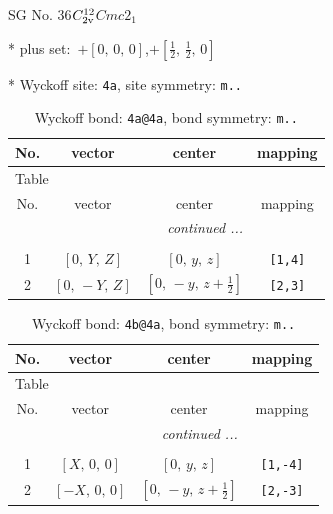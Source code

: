 \documentclass[fleqn,8pt]{jsarticle}
\begin{document}
\setcounter{MaxMatrixCols}{32}

\renewcommand{\tablename}{Table~}
\renewcommand{\figurename}{Figure~}
\begin{center}
\LARGE
SG No. 36\quad$C_{\rm 2v}^{12}$\quad$Cmc2_1$\quad[ orthorhombic ]
\end{center}

* plus set:\,\,\,$+\left[ 0,\, 0,\, 0 \right]$,\quad $+\left[ \frac{1}{2},\, \frac{1}{2},\, 0 \right]$


* Wyckoff site: {\tt 4a}, site symmetry: {\tt m..}
\renewcommand{\arraystretch}{1.2}
\begin{longtable}{cccc}
\caption{Wyckoff bond: {\tt 4a@4a}, bond symmetry: {\tt m..}}
 \\
 \hline \hline
No. & vector & center & mapping \\ \hline \endfirsthead

\multicolumn{3}{l}{\tablename\ \thetable{}} \\
 \hline \hline
No. & vector & center & mapping \\ \hline \endhead

 \hline \hline
\multicolumn{3}{r}{\footnotesize\it continued ...} \\ \endfoot

 \hline \hline
\multicolumn{3}{r}{} \\ \endlastfoot

1 & $\left[ 0,\, Y,\, Z \right]$ & $\left[ 0,\, y,\, z \right]$ & {\tt [1,4]} \\ \hline
2 & $\left[ 0,\, - Y,\, Z \right]$ & $\left[ 0,\, - y,\, z + \frac{1}{2} \right]$ & {\tt [2,3]} \\
\end{longtable}
\renewcommand{\arraystretch}{1.2}
\begin{longtable}{cccc}
\caption{Wyckoff bond: {\tt 4b@4a}, bond symmetry: {\tt m..}}
 \\
 \hline \hline
No. & vector & center & mapping \\ \hline \endfirsthead

\multicolumn{3}{l}{\tablename\ \thetable{}} \\
 \hline \hline
No. & vector & center & mapping \\ \hline \endhead

 \hline \hline
\multicolumn{3}{r}{\footnotesize\it continued ...} \\ \endfoot

 \hline \hline
\multicolumn{3}{r}{} \\ \endlastfoot

1 & $\left[ X,\, 0,\, 0 \right]$ & $\left[ 0,\, y,\, z \right]$ & {\tt [1,-4]} \\ \hline
2 & $\left[ - X,\, 0,\, 0 \right]$ & $\left[ 0,\, - y,\, z + \frac{1}{2} \right]$ & {\tt [2,-3]} \\
\end{longtable}
\end{document}
